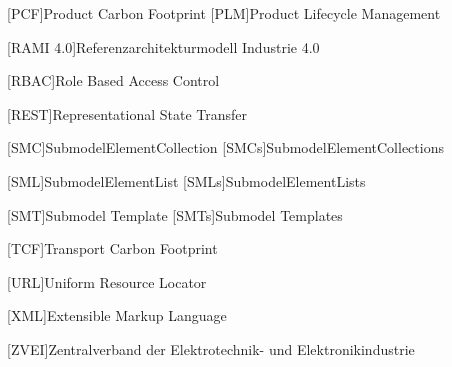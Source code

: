 {\begin{acronym}
[PCF]{Product Carbon Footprint}
[PLM]{Product Lifecycle Management}

[RAMI 4.0]{Referenzarchitekturmodell Industrie 4.0}

[RBAC]{Role Based Access Control}

[REST]{Representational State Transfer}

[SMC]{SubmodelElementCollection}
[SMCs]{SubmodelElementCollections}

[SML]{SubmodelElementList}
[SMLs]{SubmodelElementLists}

[SMT]{Submodel Template}
[SMTs]{Submodel Templates}

[TCF]{Transport Carbon Footprint}

[URL]{Uniform Resource Locator}

[XML]{Extensible Markup Language}

[ZVEI]{Zentralverband der Elektrotechnik- und Elektronikindustrie}
\end{acronym}
}

\newpage